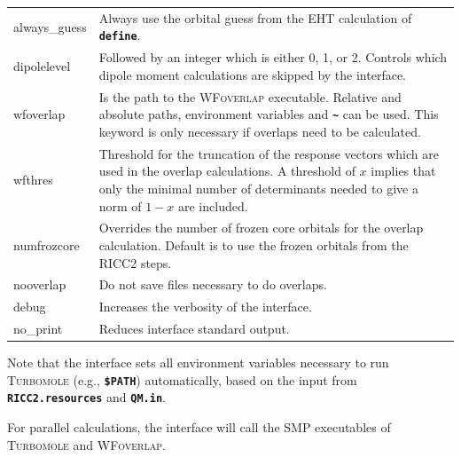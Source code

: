 \documentclass[a4paper,10pt,DIV=15,openany]{scrbook}
\newcommand{\ttt}[1]{\textbf{\texttt{#1}}}
\begin{document}
\begin{table}
\begin{tabular}{>{\ttfamily}lp{12cm}}
always\_guess   &Always use the orbital guess from the EHT calculation of \ttt{define}.\\
dipolelevel     &Followed by an integer which is either 0, 1, or 2. Controls which dipole moment calculations are skipped by the interface.\\
wfoverlap       &Is the path to the \textsc{WFoverlap} executable. Relative and absolute paths, environment variables and \ttt{\textasciitilde} can be used. This keyword is only necessary if overlaps need to be calculated.\\
wfthres         &Threshold for the truncation of the response vectors which are used in the overlap calculations. A threshold of $x$ implies that only the minimal number of determinants needed to give a norm of $1-x$ are included.\\
numfrozcore     &Overrides the number of frozen core orbitals for the overlap calculation. Default is to use the frozen orbitals from the RICC2 steps.\\
nooverlap       &Do not save files necessary to do overlaps.\\
debug           &Increases the verbosity of the interface.\\
  no\_print       &Reduces interface standard output.\\
  \hline
  \end{tabular}
\end{table}

Note that the interface sets all environment variables necessary to run \textsc{Turbomole} (e.g., \ttt{\$PATH}) automatically, based on the input from \ttt{RICC2.resources} and \ttt{QM.in}.

For parallel calculations, the interface will call the SMP executables of \textsc{Turbomole} and \textsc{WFoverlap}.
\end{document}

